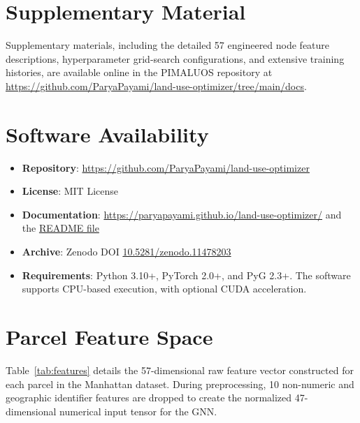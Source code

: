 \documentclass[final,3p,times]{elsarticle}
\begin{document}
\section*{Supplementary Material}
Supplementary materials, including the detailed 57 engineered node feature descriptions, hyperparameter grid-search configurations, and extensive training histories, are available online in the PIMALUOS repository at \url{https://github.com/ParyaPayami/land-use-optimizer/tree/main/docs}.

\section*{Software Availability}

\begin{itemize}
    \item \textbf{Repository}: \url{https://github.com/ParyaPayami/land-use-optimizer}
    \item \textbf{License}: MIT License
    \item \textbf{Documentation}: \url{https://paryapayami.github.io/land-use-optimizer/} and the \href{https://github.com/ParyaPayami/land-use-optimizer/blob/main/README.md}{README file}
    \item \textbf{Archive}: Zenodo DOI \href{https://doi.org/10.5281/zenodo.11478203}{10.5281/zenodo.11478203}
    \item \textbf{Requirements}: Python 3.10+, PyTorch 2.0+, and PyG 2.3+. The software supports CPU-based execution, with optional CUDA acceleration.
\end{itemize}

\appendix
\section{Parcel Feature Space}
\label{sec:appendix_features}

Table~\ref{tab:features} details the 57-dimensional raw feature vector constructed for each parcel in the Manhattan dataset. During preprocessing, 10 non-numeric and geographic identifier features are dropped to create the normalized 47-dimensional numerical input tensor for the GNN.
\end{document}
